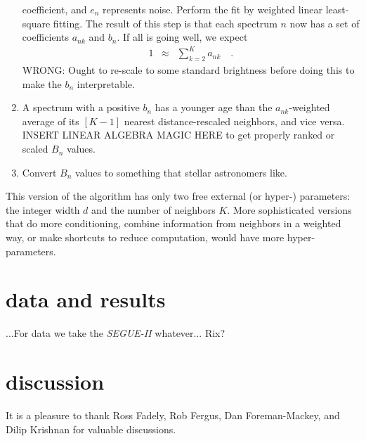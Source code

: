\documentclass[12pt, preprint]{aastex}
\newcommand{\project}[1]{\textsl{#1}}
\begin{document}
\begin{enumerate}
  coefficient, and $e_n$ represents noise.  Perform the fit by
  weighted linear least-square fitting.  The result of this step is
  that each spectrum $n$ now has a set of coefficients $a_{nk}$ and
  $b_n$.  If all is going well, we expect
  \begin{eqnarray}
    1 &\approx& \sum_{k=2}^K a_{nk}
    \quad .
  \end{eqnarray}
  WRONG: Ought to re-scale to some standard brightness before doing
  this to make the $b_n$ interpretable.
\item A spectrum with a positive $b_n$ has a younger age than the
  $a_{nk}$-weighted average of its $[K-1]$ nearest distance-rescaled
  neighbors, and vice versa.  INSERT LINEAR ALGEBRA MAGIC HERE to get
  properly ranked or scaled $B_n$ values.
\item Convert $B_n$ values to something that stellar astronomers like.
\end{enumerate}

This version of the algorithm has only two free external (or hyper-)
parameters: the integer width $d$ and the number of neighbors $K$.
More sophisticated versions that do more conditioning, combine
information from neighbors in a weighted way, or make shortcuts to
reduce computation, would have more hyper-parameters.

\section{data and results}

...For data we take the \project{SEGUE-II} whatever... Rix?

\section{discussion}

\acknowledgements It is a pleasure to thank
  Ross Fadely,
  Rob Fergus,
  Dan Foreman-Mackey, and
  Dilip Krishnan
for valuable discussions.
\end{document}
